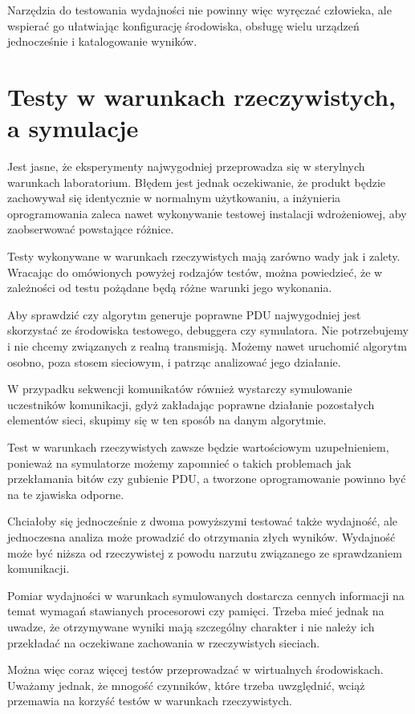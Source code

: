 \documentclass[00-praca-magisterska.tex]{subfiles}
\begin{document}
Narzędzia do testowania wydajności nie powinny więc wyręczać człowieka, ale
wspierać go ułatwiając konfigurację środowiska, obsługę wielu urządzeń
jednocześnie i katalogowanie wyników.

\section{Testy w warunkach rzeczywistych, a symulacje}

Jest jasne, że eksperymenty najwygodniej przeprowadza się w sterylnych
warunkach laboratorium. Błędem jest jednak oczekiwanie, że produkt będzie
zachowywał się identycznie w normalnym użytkowaniu, a inżynieria oprogramowania
zaleca nawet wykonywanie testowej instalacji wdrożeniowej, aby zaobserwować
powstające różnice.

Testy wykonywane w warunkach rzeczywistych mają zarówno wady jak i zalety.
Wracając do omówionych powyżej rodzajów testów, można powiedzieć, że w
zależności od testu pożądane będą różne warunki jego wykonania.

Aby sprawdzić czy algorytm generuje poprawne PDU najwygodniej jest skorzystać
ze środowiska testowego, debuggera czy symulatora. Nie potrzebujemy i nie
chcemy  związanych z realną transmisją. Możemy nawet uruchomić algorytm
osobno, poza stosem sieciowym, i patrząc  analizować jego działanie.

W przypadku sekwencji komunikatów również wystarczy symulowanie
uczestników komunikacji, gdyż zakładając poprawne działanie pozostałych
elementów sieci, skupimy się w ten sposób na danym algorytmie.

Test w warunkach rzeczywistych zawsze będzie wartościowym uzupełnieniem,
ponieważ na symulatorze możemy zapomnieć o takich problemach jak przekłamania
bitów czy gubienie PDU, a tworzone oprogramowanie powinno być na te zjawiska odporne.

Chciałoby się jednocześnie z dwoma powyższymi testować także wydajność, ale
jednoczesna analiza może prowadzić do otrzymania złych wyników. Wydajność może
być niższa od rzeczywistej z powodu narzutu związanego ze sprawdzaniem
komunikacji.

Pomiar wydajności w warunkach symulowanych dostarcza cennych informacji na
temat wymagań stawianych procesorowi czy pamięci. Trzeba mieć jednak na uwadze,
że otrzymywane wyniki mają szczególny charakter i nie należy ich przekładać na
oczekiwane zachowania w rzeczywistych sieciach. 

 Można więc coraz więcej testów przeprowadzać w wirtualnych
środowiskach. Uważamy jednak, że mnogość czynników, które trzeba uwzględnić,
wciąż przemawia na korzyść testów w warunkach rzeczywistych.
\end{document}
